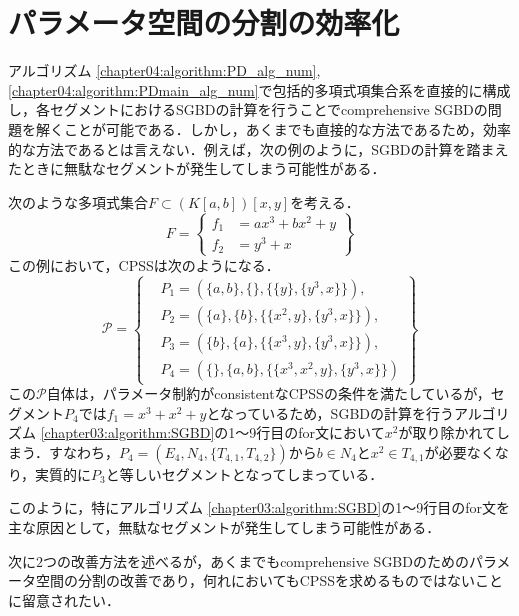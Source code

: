 \section{パラメータ空間の分割の効率化}
アルゴリズム \ref{chapter04:algorithm:PD_alg_num}, \ref{chapter04:algorithm:PDmain_alg_num}で包括的多項式項集合系を直接的に構成し，各セグメントにおけるSGBDの計算を行うことでcomprehensive SGBDの問題を解くことが可能である．しかし，あくまでも直接的な方法であるため，効率的な方法であるとは言えない．例えば，次の例のように，SGBDの計算を踏まえたときに無駄なセグメントが発生してしまう可能性がある．
\begin{example}
	次のような多項式集合$F \subset (K[a, b])[x, y]$を考える．
	\begin{equation*}
		F = \left\{
			\begin{aligned}
				f_1 &= ax^3 + bx^2 + y \\
				f_2 &= y^3 + x
			\end{aligned}
		\right\}
	\end{equation*}
	この例において，CPSSは次のようになる．
	\begin{equation*}
		\mathcal{P} = 
		\left\{
			\begin{aligned}
				&P_1 = \left( \{a, b\}, \{\}, \{ \{y\}, \{y^3, x\} \} \right), \\
				&P_2 = \left( \{a\}, \{b\}, \{ \{x^2, y\}, \{y^3, x\} \} \right), \\
				&P_3 = \left( \{b\}, \{a\}, \{ \{x^3, y\}, \{y^3, x\} \} \right), \\
				&P_4 = \left( \{\}, \{a, b\}, \{ \{x^3, x^2, y\}, \{y^3, x\} \} \right)
			\end{aligned}
		\right\}
	\end{equation*}
	この$\mathcal{P}$自体は，パラメータ制約がconsistentなCPSSの条件を満たしているが，セグメント$P_4$では$f_1 = x^3 + x^2 + y$となっているため，SGBDの計算を行うアルゴリズム \ref{chapter03:algorithm:SGBD}の1〜9行目のfor文において$x^2$が取り除かれてしまう．すなわち，$P_4=(E_4, N_4, \{T_{4, 1}, T_{4, 2}\})$から$b \in N_4$と$x^2 \in T_{4, 1}$が必要なくなり，実質的に$P_3$と等しいセグメントとなってしまっている．
\end{example}
このように，特にアルゴリズム \ref{chapter03:algorithm:SGBD}の1〜9行目のfor文を主な原因として，無駄なセグメントが発生してしまう可能性がある．

\begin{remark*}
	次に$2$つの改善方法を述べるが，あくまでもcomprehensive SGBDのためのパラメータ空間の分割の改善であり，何れにおいてもCPSSを求めるものではないことに留意されたい．
\end{remark*}

